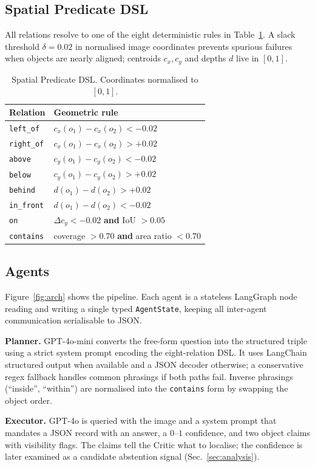 \documentclass[10pt,twocolumn,letterpaper]{article}
\newcommand{\rel}[1]{\texttt{#1}}
\begin{document}
\subsection{Spatial Predicate DSL}
All relations resolve to one of the eight deterministic rules in
Table~\ref{tab:dsl}. A slack threshold $\delta=0.02$ in normalised image
coordinates prevents spurious failures when objects are nearly aligned;
centroids $c_x, c_y$ and depths $d$ live in $[0,1]$.

\begin{table}[!htbp]
\centering
\small
\caption{Spatial Predicate DSL. Coordinates normalised to $[0,1]$.}
\label{tab:dsl}
\begin{tabular}{ll}
\toprule
Relation & Geometric rule \\
\midrule
\rel{left\_of}  & $c_x(o_1)-c_x(o_2) < -0.02$ \\
\rel{right\_of} & $c_x(o_1)-c_x(o_2) > +0.02$ \\
\rel{above}     & $c_y(o_1)-c_y(o_2) < -0.02$ \\
\rel{below}     & $c_y(o_1)-c_y(o_2) > +0.02$ \\
\rel{behind}    & $d(o_1)-d(o_2) > +0.02$ \\
\rel{in\_front} & $d(o_1)-d(o_2) < -0.02$ \\
\rel{on}        & $\Delta c_y < -0.02$ \textbf{and} IoU $> 0.05$ \\
\rel{contains}  & coverage $> 0.70$ \textbf{and} area ratio $< 0.70$ \\
\bottomrule
\end{tabular}
\end{table}

\subsection{Agents}
Figure~\ref{fig:arch} shows the pipeline. Each agent is a stateless LangGraph
node reading and writing a single typed \texttt{AgentState}, keeping all
inter-agent communication serialisable to JSON.

\textbf{Planner.} GPT-4o-mini converts the free-form question into the
structured triple using a strict system prompt encoding the eight-relation
DSL. It uses LangChain structured output when available and a JSON decoder
otherwise; a conservative regex fallback handles common phrasings if both
paths fail. Inverse phrasings (``inside'', ``within'') are normalised into the
\rel{contains} form by swapping the object order.

\textbf{Executor.} GPT-4o is queried with the image and a system prompt that
mandates a JSON record with an answer, a $0$--$1$ confidence, and two object
claims with visibility flags. The claims tell the Critic what to localise; the
confidence is later examined as a candidate abstention signal
(Sec.~\ref{sec:analysis}).
\end{document}
